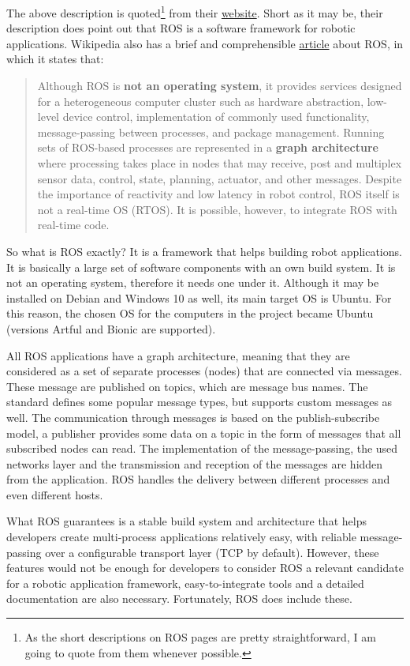 The above description is quoted\footnote{As the short descriptions on ROS pages are pretty straightforward, I am going to quote from them whenever possible.} from their \href{https://www.ros.org/}{website}. Short as it may be, their description does point out that ROS is a software framework for robotic applications. Wikipedia also has a brief and comprehensible \href{https://en.wikipedia.org/wiki/Robot_Operating_System}{article} about ROS, in which it states that:

\begin{quote}
Although ROS is \textbf{not an operating system}, it provides services designed for a heterogeneous computer cluster such as hardware abstraction, low-level device control, implementation of commonly used functionality, message-passing between processes, and package management. Running sets of ROS-based processes are represented in a \textbf{graph architecture} where processing takes place in nodes that may receive, post and multiplex sensor data, control, state, planning, actuator, and other messages. Despite the importance of reactivity and low latency in robot control, ROS itself is not a real-time OS (RTOS). It is possible, however, to integrate ROS with real-time code.
\end{quote}

So what is ROS exactly? It is a framework that helps building robot applications. It is basically a large set of software components with an own build system. It is not an operating system, therefore it needs one under it. Although it may be installed on Debian and Windows 10 as well, its main target OS is Ubuntu. For this reason, the chosen OS for the computers in the project became Ubuntu (versions Artful and Bionic are supported).

All ROS applications have a graph architecture, meaning that they are considered as a set of separate processes (nodes) that are connected via messages. These message are published on topics, which are message bus names. The standard defines some popular message types, but supports custom messages as well. The communication through messages is based on the publish-subscribe model, a publisher provides some data on a topic in the form of messages that all subscribed nodes can read. The implementation of the message-passing, the used networks layer and the transmission and reception of the messages are hidden from the application. ROS handles the delivery between different processes and even different hosts.

What ROS guarantees is a stable build system and architecture that helps developers create multi-process applications relatively easy, with reliable message-passing over a configurable transport layer (TCP by default). However, these features would not be enough for developers to consider ROS a relevant candidate for a robotic application framework, easy-to-integrate tools and a detailed documentation are also necessary. Fortunately, ROS does include these.

